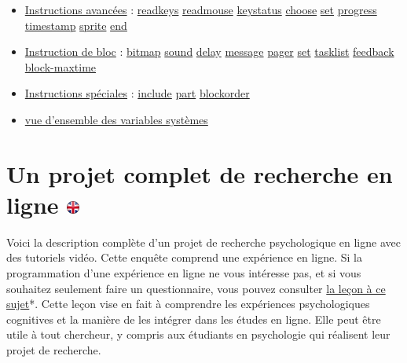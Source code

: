 \documentclass[
]{book}
\begin{document}
\begin{itemize}
\item
  \protect\hyperlink{very_advanced_instructions}{Instructions avancées}
  : \protect\hyperlink{task-readkeys}{readkeys} \textbar{}
  \protect\hyperlink{task-readmouse}{readmouse}\textbar{}
  \protect\hyperlink{task-keystatus}{keystatus} \textbar{}
  \protect\hyperlink{task-choose}{choose} \textbar{}
  \protect\hyperlink{task-set}{set} \textbar{}
  \href{task-progress}{progress} \textbar{}
  \protect\hyperlink{timestamp}{timestamp} \textbar{}
  \protect\hyperlink{sprite}{sprite} \textbar{}
  \protect\hyperlink{end}{end}
\item
  \protect\hyperlink{block}{Instruction de bloc} :
  \protect\hyperlink{block-bitmap2}{bitmap} \textbar{}
  \protect\hyperlink{block-sound2}{sound} \textbar{}
  \protect\hyperlink{block-delay2}{delay} \textbar{}
  \protect\hyperlink{block-message}{message} \textbar{}
  \protect\hyperlink{block-pager}{pager} \textbar{}
  \protect\hyperlink{block-set}{set} \textbar{}
  \protect\hyperlink{block-tasklist}{tasklist} \textbar{}
  \protect\hyperlink{block-feedback}{feedback} \textbar{}
  \protect\hyperlink{block-maxtime}{block-maxtime}
\item
  \protect\hyperlink{s5-13}{Instructions spéciales} :
  \protect\hyperlink{include}{include} \textbar{}
  \protect\hyperlink{part}{part} \textbar{}
  \protect\hyperlink{blockorder}{blockorder}
\item
  \protect\hyperlink{sysvars}{vue d'ensemble des variables systèmes}
\end{itemize}

\hypertarget{un-projet-complet-de-recherche-en-ligne-ukflag}{%
\chapter[Un projet complet de recherche en ligne ]{\texorpdfstring{Un
projet complet de recherche en ligne
\href{https://www.psytoolkit.org/lessons/project.html}{\protect\includegraphics{img/ukflag.png}}}{Un projet complet de recherche en ligne ukflag}}\label{un-projet-complet-de-recherche-en-ligne-ukflag}}

Voici la description complète d'un projet de recherche psychologique en
ligne avec des tutoriels vidéo. Cette enquête comprend une expérience en
ligne. Si la programmation d'une expérience en ligne ne vous intéresse
pas, et si vous souhaitez seulement faire un questionnaire, vous pouvez
consulter \protect\hyperlink{questionnaire-project}{la leçon à ce
sujet}*. Cette leçon vise en fait à comprendre les expériences
psychologiques cognitives et la manière de les intégrer dans les études
en ligne. Elle peut être utile à tout chercheur, y compris aux étudiants
en psychologie qui réalisent leur projet de recherche.
\end{document}
